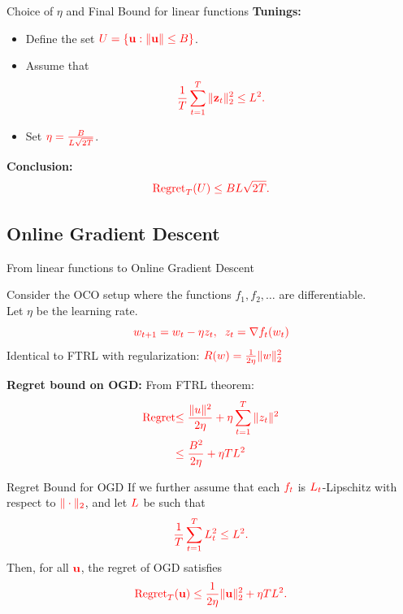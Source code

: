 \documentclass[handout]{beamer}
\begin{document}
\begin{small}
\begin{frame}{Choice of \(\eta\) and Final Bound for linear functions}
    \textbf{Tunings:}
    \begin{itemize}
        \item Define the set \(\textcolor{red}{U = \{\mathbf{u} : \|\mathbf{u}\| \leq B\}}\).
        \item Assume that
        \[
        \textcolor{red}{\frac{1}{T} \sum_{t=1}^{T} \|\mathbf{z}_t\|_2^2 \leq L^2.}
        \]
        \item Set \(\textcolor{red}{\eta = \frac{B}{L\sqrt{2T}}}\).
    \end{itemize}

    \textbf{Conclusion:}
    \begin{equation*}
        \textcolor{red}{\text{Regret}_T(U) \leq B L \sqrt{2T}.}
    \end{equation*}
\end{frame}

\subsection{Online Gradient Descent}
\begin{frame}{From linear functions to Online Gradient Descent}
\begin{example}
  Consider the OCO setup where the functions $f_1,f_2,\ldots$ are differentiable.\\
  Let $\eta$ be the learning rate.
\[
  \textcolor{red}{w_{t+1} = w_t - \eta z_t,\;\;
    z_t = \nabla f_t(w_t)}
\]
Identical to FTRL with regularization: $\textcolor{red}{R(w) = \frac{1}{2\eta}\|w\|_2^2}$
\end{example}


{\bf Regret bound on OGD:} From FTRL theorem:
\begin{align*}
\textcolor{red}{\text{Regret}} &\textcolor{red}{\leq \frac{\|u\|^2}{2\eta} + \eta \sum_{t=1}^T \|z_t\|^2} \\
&\textcolor{red}{\leq \frac{B^2}{2\eta} + \eta T L^2}
\end{align*}
\end{frame}

\begin{frame}{Regret Bound for OGD}
  If we further assume that each \(\textcolor{red}{f_t}\) is \(\textcolor{red}{L_t}\)-Lipschitz with respect to \(\textcolor{red}{\|\cdot\|_2}\),
  and let \(\textcolor{red}{L}\) be such that 
  \[
    \textcolor{red}{\frac{1}{T} \sum_{t=1}^{T} L_t^2 \leq L^2.}
  \]
  Then, for all \(\textcolor{red}{\mathbf{u}}\), the regret of OGD satisfies
  \begin{equation*}
    \textcolor{red}{\text{Regret}_T(\mathbf{u}) \leq \frac{1}{2\eta} \|\mathbf{u}\|_2^2 + \eta T L^2.}
  \end{equation*}
\end{frame}


\end{small}
\end{document}
